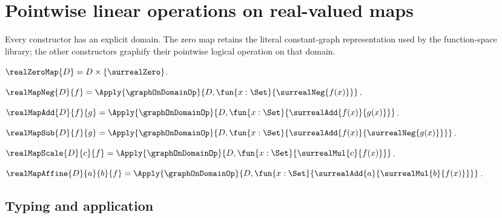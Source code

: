 






\section{Pointwise linear operations on real-valued maps}

Every constructor has an explicit domain.  The zero map retains the literal
constant-graph representation used by the function-space library; the other
constructors graphify their pointwise logical operation on that domain.

\begin{definition}\label{real_zero_map}
    $\realZeroMap{D}=D\times\{\surrealZero\}$.
\end{definition}

\begin{definition}\label{real_map_neg}
    $\realMapNeg{D}{f}=\Apply{\graphOnDomainOp}
        {D,\fun{x:\Set}{\surrealNeg{f(x)}}}$.
\end{definition}

\begin{definition}\label{real_map_add}
    $\realMapAdd{D}{f}{g}=\Apply{\graphOnDomainOp}
        {D,\fun{x:\Set}{\surrealAdd{f(x)}{g(x)}}}$.
\end{definition}

\begin{definition}\label{real_map_sub}
    $\realMapSub{D}{f}{g}=\Apply{\graphOnDomainOp}
        {D,\fun{x:\Set}{\surrealAdd{f(x)}{\surrealNeg{g(x)}}}}$.
\end{definition}

\begin{definition}\label{real_map_scale}
    $\realMapScale{D}{c}{f}=\Apply{\graphOnDomainOp}
        {D,\fun{x:\Set}{\surrealMul{c}{f(x)}}}$.
\end{definition}

\begin{definition}\label{real_map_affine}
    $\realMapAffine{D}{a}{b}{f}=\Apply{\graphOnDomainOp}
        {D,\fun{x:\Set}{\surrealAdd{a}{\surrealMul{b}{f(x)}}}}$.
\end{definition}

\subsection{Typing and application}

